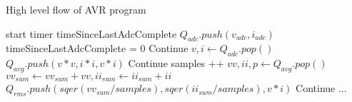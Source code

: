 \begin{algorithm}
	\caption{High level flow of AVR program}
	\label{algo:AVRalgo}
\begin{algorithmic}[1]
\State start timer timeSinceLastAdcComplete
		    \State $Q_{adc}.push(v_{adc}, i_{adc})$
		    \State timeSinceLastAdcComplete = 0
		\Else
		    \State Continue
	    \EndIf
    \EndIf
		\State $v, i \gets Q_{adc}.pop()$
		\State $Q_{avg}.push( v*v, i*i , v*i)$
		\State Continue
	\EndIf
		\State samples ++
		\State $vv, ii, p \gets Q_{avg}.pop() $
		\State $vv_{sum} \gets vv_{sum} + vv, ii_{sum} \gets ii_{sum} + ii$
		\State $Q_{rms}.push(sqer(vv_{sum} /samples), sqer(ii_{sum} /samples) , v*i)$
		\State Continue
	\EndIf
	\State ...

\EndWhile

\end{algorithmic}

\end{algorithm}
